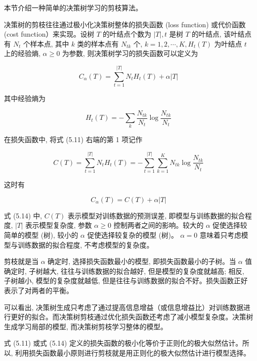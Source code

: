 \documentclass[10pt]{article}
\begin{document}
\begin{CJK*}{UTF8}{bsmi}
本节介绍一种简单的决策树学习的剪枝算法。

决策树的剪枝往往通过极小化决策树整体的损失函数 (loss function) 或代价函数 (cost function）来实现。设树 $T$ 的叶结点个数为 $|T|, t$ 是树 $T$ 的叶结点, 该叶结点有 $N_{t}$ 个样本点, 其中 $k$ 类的样本点有 $N_{t k}$ 个, $k=1,2, \cdots, K, H_{t}(T)$ 为叶结点 $t$ 上的经验熵, $\alpha \geqslant 0$ 为参数, 则决策树学习的损失函数可以定义为


\begin{equation*}
C_{\alpha}(T)=\sum_{t=1}^{|T|} N_{t} H_{t}(T)+\alpha|T| \tag{5.11}
\end{equation*}


其中经验熵为


\begin{equation*}
H_{t}(T)=-\sum_{k} \frac{N_{t k}}{N_{t}} \log \frac{N_{t k}}{N_{t}} \tag{5.12}
\end{equation*}


在损失函数中, 将式 (5.11) 右端的第 1 项记作


\begin{equation*}
C(T)=\sum_{t=1}^{|T|} N_{t} H_{t}(T)=-\sum_{t=1}^{|T|} \sum_{k=1}^{K} N_{t k} \log \frac{N_{t k}}{N_{t}} \tag{5.13}
\end{equation*}


这时有


\begin{equation*}
C_{\alpha}(T)=C(T)+\alpha|T| \tag{5.14}
\end{equation*}


式 (5.14) 中, $C(T)$ 表示模型对训练数据的预测误差, 即模型与训练数据的拟合程度, $|T|$ 表示模型复杂度, 参数 $\alpha \geqslant 0$ 控制两者之间的影响。较大的 $\alpha$ 促使选择较简单的模型 (树), 较小的 $\alpha$ 促使选择较复杂的模型 (树)。 $\alpha=0$ 意味着只考虑模型与训练数据的拟合程度, 不考虑模型的复杂度。

剪枝就是当 $\alpha$ 确定时, 选择损失函数最小的模型, 即损失函数最小的子树。当 $\alpha$ 值确定时, 子树越大, 往往与训练数据的拟合越好, 但是模型的复杂度就越高; 相反, 子树越小, 模型的复杂度就越低, 但是往往与训练数据的拟合不好。损失函数正好表示了对两者的平衡。

可以看出, 决策树生成只考虑了通过提高信息增益（或信息增益比）对训练数据进行更好的拟合。而决策树剪枝通过优化损失函数还考虑了减小模型复杂度。决策树生成学习局部的模型, 而决策树剪枝学习整体的模型。

式 (5.11) 或式 (5.14) 定义的损失函数的极小化等价于正则化的极大似然估计。所以, 利用损失函数最小原则进行剪枝就是用正则化的极大似然估计进行模型选择。


\end{CJK*}
\end{document}
